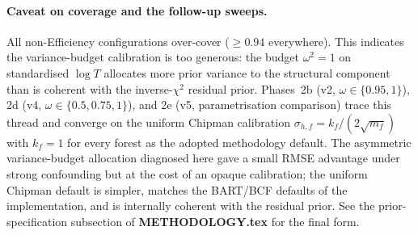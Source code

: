 \documentclass[11pt]{article}
\theoremstyle{plain}
\theoremstyle{definition}
\theoremstyle{remark}
\newcommand{\1}{\mathds{1}}
\begin{document}
\paragraph{Caveat on coverage and the follow-up sweeps.}
All non-Efficiency configurations over-cover ($\geq 0.94$ everywhere).
This indicates the variance-budget calibration is too generous: the
budget $\omega^2 = 1$ on standardised $\log T$ allocates more prior
variance to the structural component than is coherent with the
inverse-$\chi^2$ residual prior.
Phases~2b (v2, $\omega \in \{0.95, 1\}$), 2d (v4, $\omega \in \{0.5, 0.75, 1\}$),
and 2e (v5, parametrisation comparison) trace this thread and converge on
the uniform Chipman calibration $\sigma_{h,f} = k_f/(2\sqrt{m_f})$ with
$k_f = 1$ for every forest as the adopted methodology default.
The asymmetric variance-budget allocation diagnosed here gave a small
RMSE advantage under strong confounding but at the cost of an opaque
calibration; the uniform Chipman default is simpler, matches the BART/BCF
defaults of the implementation, and is internally coherent with the
residual prior. See the prior-specification subsection of
\textbf{METHODOLOGY.tex} for the final form.



\end{document}
